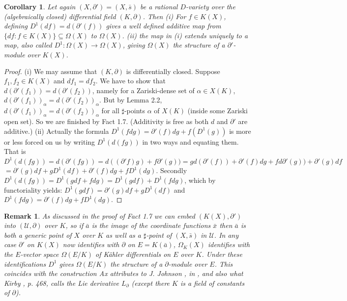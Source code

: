 \documentclass[12pt]{article}
\newtheorem{Remark}[Theorem]{Remark}
\newtheorem{Corollary}[Theorem]{Corollary}
\begin{document}
\begin{Corollary} Let again $(X,\partial ') = (X,{\bar s})$ be a rational $D$-variety over the (algebraically closed) differential field $(K,\partial)$.  Then 
\newline
(i) For $f\in K(X)$, defining $D^{1}(df) = d(\partial ' (f))$ gives a well defined additive map from $\{df: f\in K(X)\}\subseteq {\Omega}(X)$ to $\Omega(X)$. 
\newline
(ii) the map in (i) extends uniquely to a map, also called $D^{1}:\Omega(X) \to \Omega(X)$, giving ${\Omega}(X)$ the structure of a $\partial '$-module over $K(X)$. 
\end{Corollary} 
\begin{proof}  (i) We may assume that $(K,\partial)$ is differentially closed. 
Suppose  $f_{1}, f_{2}\in K(X)$ and $df_{1} = df_{2}$. 
We have to show that $d(\partial ' (f_{1})) = d(\partial ' (f_{2}))$, namely for a Zariski-dense set of $\alpha\in X(K)$, $d(\partial ' (f_{1}))_{\alpha} = d(\partial ' (f_{2}))_{\alpha}$.
But by Lemma 2.2, $d(\partial ' (f_{1}))_{\alpha} = d(\partial ' (f_{2}))_{\alpha}$ for all $\sharp$-points $\alpha$ of $X(K)$ (inside some Zariski open set).  So  we are finished by Fact 1.7. 
(Additivity is free as both $d$ and $\partial '$ are additive.)
\newline
(ii)  Actually the formula  $D^{1}(fdg) = \partial '(f)dg + f(D^{1}(g))$ is more or less forced on us by writing $D^{1}(d(fg))$ in two ways and equating them.  That is
$D^{1}(d(fg)) = d(\partial '(fg)) = d((\partial ' f)g) + f{\partial '}(g)) = g d(\partial '(f)) + {\partial '} (f) dg  + fd{\partial '}(g)) + {\partial '}(g)df$
\newline
$ = {\partial '}(g)df + g D^{1}(df)   + {\partial ' }(f) dg +  fD^{1}(dg)$.
Secondly
$D^{1}(d(fg)) = D^{1}(gdf + fdg) = D^{1}(gdf) + D^{1}(fdg)$, which by functoriality yields:
\newline
$D^{1}(gdf) =  {\partial '}(g)df + g D^{1}(df)$ and
\newline
$D^{1}(fdg) =  {\partial '} (f) dg +  fD^{1}(dg)$. 

\end{proof} 

\begin{Remark}  As discussed in the proof of Fact 1.7 we can  embed $(K(X),\partial')$ into $({\mathcal U},\partial)$ over $K$, so if ${\bar a}$ is the image of the coordinate functions ${\bar x}$ then ${\bar a}$ is both a generic point of $X$ over $K$ as well as a $\sharp$-point of $(X,{\bar s})$ in ${\mathcal U}$.  
In any case $\partial '$ on $K(X)$ now identifies with $\partial$ on $E = K({\bar a})$, ${\Omega}_{K}(X)$ identifies with the $E$-vector space $\Omega(E/K)$ of K\"ahler differentials on $E$ over $K$.   Under these identifications $D^{1}$ gives  $\Omega(E/K)$ the structure of a $\partial$-module over $E$.  This coincides with the construction Ax attributes to J. Johnson \cite{Johnson1}, \cite{Johnson2} in \cite{Ax}, and also what Kirby \cite{Kirby}, p. 468, calls the Lie derivative $L_{\partial}$  (except there $K$ is a field of constants of $\partial$). 
\end{Remark}
\end{document}
